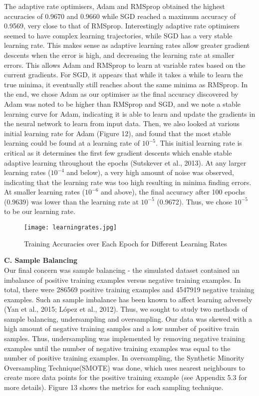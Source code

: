 \documentclass{article}
\begin{document}
The adaptive rate optimisers, Adam and RMSprop obtained the highest accuracies of 0.9670 and 0.9660 while SGD reached a maximum accuracy of 0.9569, very close to that of RMSprop. Interestingly adaptive rate optimisers seemed to have complex learning trajectories, while SGD has a very stable learning rate. This makes sense as adaptive learning rates allow greater gradient descents when the error is high, and decreasing the learning rate at smaller errors. This allows Adam and RMSprop to learn at variable rates based on the current gradients. For SGD, it appears that while it takes a while to learn the true minima, it eventually still reaches about the same minima as RMSprop. In the end, we chose Adam as our optimiser as the final accuracy discovered by Adam was noted to be higher than RMSprop and SGD, and we note a stable learning curve for Adam, indicating it is able to learn and update the gradients in the neural network to learn from input data. Then, we also looked at various initial learning rate for Adam (Figure 12), and found that the most stable learning could be found at a learning rate of $10^{-5}$. This initial learning rate is critical as it determines the first few gradient descents which enable stable adaptive learning throughout the epochs (Sutskever et al., 2013). At any larger learning rates ($10^{-4}$ and below), a very high amount of noise was observed, indicating that the learning rate was too high resulting in minima finding errors. At smaller learning rates ($10^{-6}$ and above), the final accuracy after 100 epochs (0.9639) was lower than the learning rate at $10^{-5}$ (0.9672). Thus, we chose $10^{-5}$ to be our learning rate.


\begin{figure}[H]
\texttt{[image: learningrates.jpg]}
\centering
\caption{Training Accuracies over Each Epoch for Different Learning Rates}
\end{figure}
\textbf{C. Sample Balancing}\\
Our final concern was sample balancing - the simulated dataset contained an imbalance of positive training examples versus negative training examples. In total, there were 286569 positive training examples and 4547919 negative training examples. Such an sample imbalance has been known to affect learning adversely (Yan et al., 2015; López et al., 2012). Thus, we sought to study two methods of sample balancing, undersampling and oversampling. Our data was skewed with a high amount of negative training samples and  a low number of positive train samples. Thus, undersampling was implemented by removing negative training examples until the number of negative training examples was equal to the number of positive training examples. In oversampling, the Synthetic Minority Oversampling Technique(SMOTE) was done, which uses nearest neighbours to create more data points for the positive training example (see Appendix 5.3 for more details). Figure 13 shows the metrics for each sampling technique.
\end{document}
